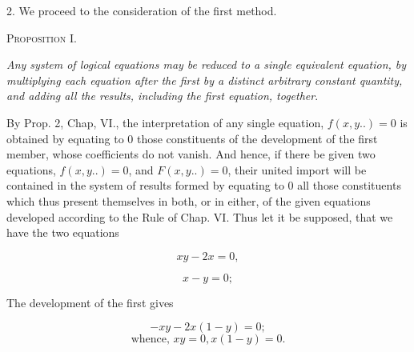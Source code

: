 \documentclass[oneside]{book}
\begin{document}
2. We proceed to the consideration of the first method.

\begin{center}
\textsc{Proposition I}.
\end{center}

\textit{Any system of logical equations may be reduced to a single equivalent
equation, by multiplying each equation after the first by a distinct
arbitrary constant quantity, and adding all the results, including
the first equation, together}.

By Prop. 2, Chap, VI., the interpretation of any single
equation, $f(x, y..) = 0$ is obtained by equating to 0 those constituents
of the development of the first member, whose coefficients
do not vanish. And hence, if there be given two equations,
$f(x, y..) = 0$, and $F(x, y..) = 0$, their united import will be
contained in the system of results formed by equating to 0 all
those constituents which thus present themselves in both, or in
either, of the given equations developed according to the Rule of
Chap. VI. Thus let it be supposed, that we have the two equations

\begin{equation}
xy - 2x = 0,
\end{equation}

\begin{equation}
x - y = 0;
\end{equation}

The development of the first gives

\[
- xy - 2x (1 - y) = 0;
\]
\begin{equation}
\textrm{whence, }xy = 0, x (1 - y) = 0.
\end{equation}
\end{document}

